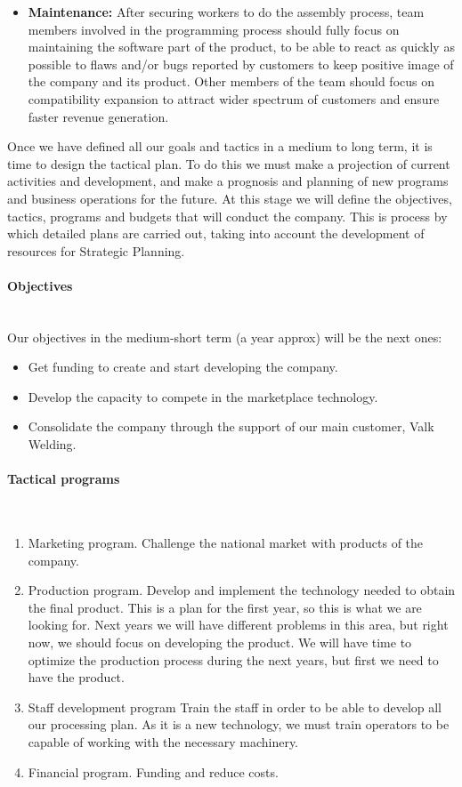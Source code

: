 \begin{itemize}
\item \textbf{Maintenance:} After securing workers to do the assembly process, team members involved in the programming process should fully focus on maintaining the software part of the product, to be able to react as quickly as possible to flaws and/or bugs reported by customers to keep positive image of the company and its product. Other members of the team should focus on compatibility expansion to attract wider spectrum of customers and ensure faster revenue generation.
\end{itemize}


Once we have defined all our goals and tactics in a medium to long term, it is time to design the tactical plan. To do this we must make a projection of current activities and development, and make a prognosis and planning of new programs and business operations for the future. At this stage we will define the objectives, tactics, programs and budgets that will conduct the company. This is process by which detailed plans are carried out, taking into account the development of resources for Strategic Planning.

\paragraph*{Objectives}~\\
Our objectives in the medium-short term (a year approx) will be the next ones:
\begin{itemize}[-]
\item Get funding to create and start developing the company.
\item Develop the capacity to compete in the marketplace technology.
\item Consolidate the company through the support of our main customer, Valk Welding.
\end{itemize}

\paragraph*{Tactical programs}~\\

\begin{enumerate}
\item Marketing program.
      Challenge the national market with products of the company.
\item Production program.
	Develop and implement the technology needed to obtain the final product.
	This is a plan for the first year, so this is what we are looking for. 
	Next years we will have different problems in this area, but right now, we should focus on developing the product. 
	We will have time to optimize the production process during the next years, but first we need to have the product.
\item Staff development program
	Train the staff in order to be able to develop all our processing plan.
	As it is a new technology, we must train operators to be capable of working with the necessary machinery.
\item Financial program.
      Funding and reduce costs.	
\end{enumerate}



